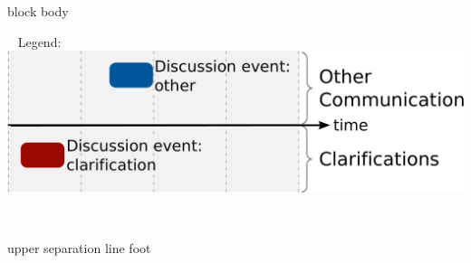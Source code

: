 \documentclass[final]{beamer} %
\begin{document}
\begin{frame}{}
\begin{columns}[t]
\begin{column}{.45\linewidth}
    \vspace{6\columnsep}

    
\begin{beamercolorbox}[rounded=true,leftskip=1cm,colsep*=.75ex,wd=\linewidth]{block body}
\begin{center}
~ Legend: \includegraphics[width=18cm]{img/pattern-legend} ~
\end{center}

\end{beamercolorbox}

\end{column}


\end{columns}

  \vspace{2\columnsep}
  \vspace{2\columnsep}


  \begin{beamercolorbox}[wd=\paperwidth]{upper separation line foot}
    \rule{0pt}{2pt}
  \end{beamercolorbox}%
%
  

\end{frame}
\end{document}
